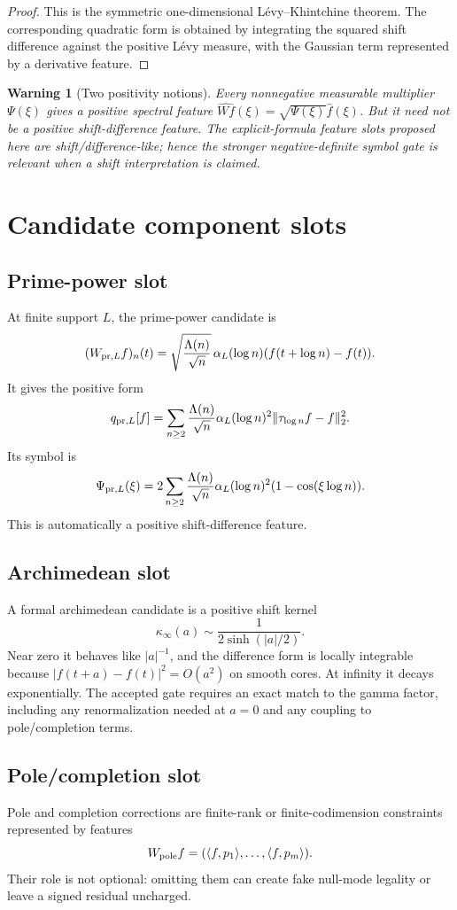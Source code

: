 \documentclass[11pt]{article}
\newtheorem{warning}{Warning}
\begin{document}
\begin{proof}
This is the symmetric one-dimensional Lévy--Khintchine theorem. The corresponding quadratic form is obtained by integrating the squared shift difference against the positive Lévy measure, with the Gaussian term represented by a derivative feature.
\end{proof}

\begin{warning}[Two positivity notions]
Every nonnegative measurable multiplier $\Psi(\xi)$ gives a positive spectral feature $\widehat{Wf}(\xi)=\sqrt{\Psi(\xi)}\widehat f(\xi)$. But it need not be a positive shift-difference feature. The explicit-formula feature slots proposed here are shift/difference-like; hence the stronger negative-definite symbol gate is relevant when a shift interpretation is claimed.
\end{warning}

\section{Candidate component slots}
\subsection{Prime-power slot}
At finite support $L$, the prime-power candidate is
\[
(W_{{\rm pr},L}f)_n(t)=\sqrt{\frac{\Lambda(n)}{\sqrt n}}\,\alpha_L(\log n)(f(t+\log n)-f(t)).
\]
It gives the positive form
\[
q_{{\rm pr},L}[f]=\sum_{n\ge2}\frac{\Lambda(n)}{\sqrt n}\alpha_L(\log n)^2\|\tau_{\log n}f-f\|_2^2.
\]
Its symbol is
\[
\Psi_{{\rm pr},L}(\xi)=2\sum_{n\ge2}\frac{\Lambda(n)}{\sqrt n}\alpha_L(\log n)^2(1-\cos(\xi\log n)).
\]
This is automatically a positive shift-difference feature.

\subsection{Archimedean slot}
A formal archimedean candidate is a positive shift kernel
\[
\kappa_\infty(a)\sim \frac{1}{2\sinh(|a|/2)}.
\]
Near zero it behaves like $|a|^{-1}$, and the difference form is locally integrable because $|f(t+a)-f(t)|^2=O(a^2)$ on smooth cores. At infinity it decays exponentially. The accepted gate requires an exact match to the gamma factor, including any renormalization needed at $a=0$ and any coupling to pole/completion terms.

\subsection{Pole/completion slot}
Pole and completion corrections are finite-rank or finite-codimension constraints represented by features
\[
W_{\rm pole}f=(\langle f,p_1\rangle,\ldots,\langle f,p_m\rangle).
\]
Their role is not optional: omitting them can create fake null-mode legality or leave a signed residual uncharged.
\end{document}
